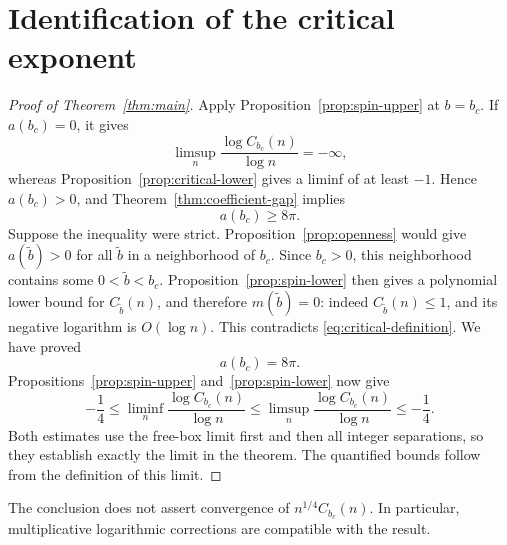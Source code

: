 \section{Identification of the critical exponent}
\label{sec:critical}

\begin{proof}[Proof of Theorem~\ref{thm:main}]
Apply Proposition~\ref{prop:spin-upper} at \(b=b_c\).
If \(a(b_c)=0\), it gives
\[
 \limsup_n\frac{\log C_{b_c}(n)}{\log n}=-\infty,
\]
whereas Proposition~\ref{prop:critical-lower} gives a liminf of at least
\(-1\). Hence \(a(b_c)>0\), and
Theorem~\ref{thm:coefficient-gap} implies
\[
                         a(b_c)\ge8\pi.
\]
Suppose the inequality were strict.
Proposition~\ref{prop:openness} would give \(a(\widetilde b)>0\)
for all \(\widetilde b\) in a neighborhood of \(b_c\).
Since \(b_c>0\), this neighborhood contains some
\(0<\widetilde b<b_c\).
Proposition~\ref{prop:spin-lower} then gives a polynomial lower
bound for \(C_{\widetilde b}(n)\), and therefore
\(m(\widetilde b)=0\): indeed \(C_{\widetilde b}(n)\le1\), and
its negative logarithm is \(O(\log n)\).
This contradicts \eqref{eq:critical-definition}. We have proved
\[
                              a(b_c)=8\pi.
\]
Propositions~\ref{prop:spin-upper} and~\ref{prop:spin-lower}
now give
\[
 -\frac14
 \le\liminf_n\frac{\log C_{b_c}(n)}{\log n}
 \le\limsup_n\frac{\log C_{b_c}(n)}{\log n}
 \le-\frac14.
\]
Both estimates use the free-box limit first and then all integer
separations, so they establish exactly the limit in the theorem.
The quantified bounds follow from the definition of this limit.
\end{proof}

The conclusion does not assert convergence of
\(n^{1/4}C_{b_c}(n)\). In particular, multiplicative logarithmic
corrections are compatible with the result.

